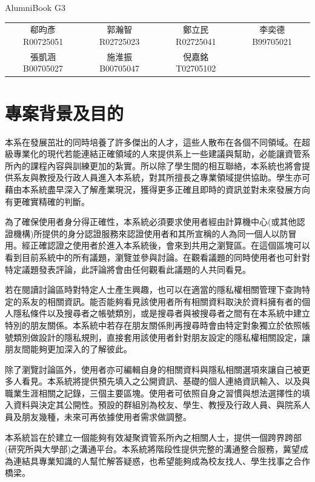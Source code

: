 \documentclass[11pt]{article}
\begin{document}
\begin{center}{\Huge AlumniBook} {G3} \end{center}

\begin{center}
\begin{tabular}{cccc}
郗昀彥 R00725051&郭瀚智 R02725023&鄭立民 R02725041&李奕德 B99705021 \\
張凱涵 B00705027&施淮振 B00705047&倪嘉銘 T02705102&
\end{tabular}
\noindent\makebox[\linewidth]{\rule{\linewidth}{0.4pt}}
\end{center}

\tableofcontents

\section{專案背景及目的}

本系在發展茁壯的同時培養了許多傑出的人才，這些人散布在各個不同領域。在超級專業化的現代若能連結正確領域的人來提供系上一些建議與幫助，必能讓資管系所內的課程內容與訓練更加的紮實。所以除了學生間的相互聯絡，本系統也將會提供系友與教授及行政人員進入本系統，對其所擅長之專業領域提供協助。學生亦可藉由本系統盡早深入了解產業現況，獲得更多正確且即時的資訊並對未來發展方向有更確實精確的判斷。

為了確保使用者身分得正確性，本系統必須要求使用者經由計算機中心(或其他認證機構)所提供的身分認證服務來認證使用者和其所宣稱的人為同一個人以防冒用。經正確認證之使用者於進入本系統後，會來到共用之瀏覽區。在這個區塊可以看到目前系統中的所有議題，瀏覽並參與討論。在觀看議題的同時使用者也可針對特定議題發表評論，此評論將會由任何觀看此議題的人共同看見。

若在閱讀討論區時對特定人士產生興趣，也可以在適當的隱私權相關管理下查詢特定的系友的相關資訊。能否能夠看見該使用者所有相關資料取決於資料擁有者的個人隱私條件以及搜尋者之帳號類別，或是搜尋者與被搜尋者之間有在本系統中建立特別的朋友關係。本系統中若存在朋友關係則再搜尋時會由特定對象獨立於依照帳號類別做設計的隱私規則，直接套用該使用者針對朋友設定的隱私權相關設定，讓朋友間能夠更加深入的了解彼此。

除了瀏覽討論區外，使用者亦可編輯自身的相關資料與隱私相關選項來讓自己被更多人看見。本系統將提供預先填入之公開資訊、基礎的個人連絡資訊輸入、以及與職業生涯相關之記錄，三個主要區塊。使用者可依照自身之習慣與想法選擇性的填入資料與決定其公開性。預設的群組別為校友、學生、教授及行政人員、與院系人員及朋友幾種，未來可再依據使用者需求做調整。

本系統旨在於建立一個能夠有效凝聚資管系所內之相關人士，提供一個跨界跨部(研究所與大學部)之溝通平台。本系統將階段性提供完整的溝通整合服務，冀望成為連結具專業知識的人幫忙解答疑惑，也希望能夠成為校友找人、學生找事之合作橋梁。
\end{document}
